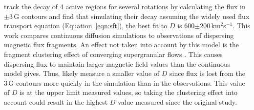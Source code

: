 \cite{Wang:1989} track the decay of 4 active regions for several rotations by calculating the flux in $\pm$3\,G contours and find that simulating their decay assuming the widely used flux transport equation (Equation~\ref{eqn:sft}), the best fit to $D$ is 600$\pm$200\,km$^2$s$^{-1}$. This work compares continuous diffusion simulations to observations of dispersing magnetic flux fragments. An effect not taken into account by this model is the fragment clustering effect of converging supergranular flows \citep{Schrijver:1992}. This causes dispersing flux to maintain larger magnetic field values than the continuous model gives. Thus, \cite{Wang:1989} likely measure a smaller value of $D$ since flux is lost from the 3\,G contours more quickly in the simulation than in the observations. This value of $D$ is at the upper limit measured values, so taking the clustering effect into account could result in the highest $D$ value measured since the original \cite{Leighton:1964} study. 






